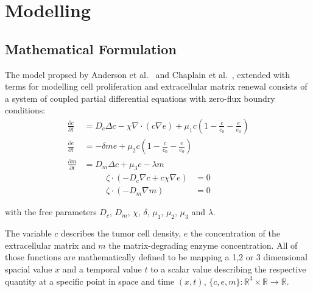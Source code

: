 \section{Modelling}

\subsection{Mathematical Formulation}

The model propsed by Anderson et al.~\cite{anderson_continuous_1998,anderson_mathematical_2000} and Chaplain et al.~\cite{anderson_continuous_1998,chaplain_mathematical_2006-1,franssen_mathematical_2019}, extended with terms for modelling cell proliferation and extracellular matrix renewal consists of a system of coupled partial differential equations with zero-flux boundry conditions: 
\begin{align}
	\frac{\partial c}{\partial t} &= D_c \Delta c - \chi \nabla \cdot (c\nabla e)  + \mu_1 c\left(1-\frac{c}{c_0}-\frac{e}{e_0}\right)\label{eq1}\\
	\frac{\partial e}{\partial t} &= -\delta m e  + \mu_2 c\left(1-\frac{c}{c_0}-\frac{e}{e_0}\right)\label{eq2}\\
	\frac{\partial m}{\partial t} &= D_m \Delta c + \mu_3 c - \lambda m\label{eq3}
\end{align}
\begin{align}
	\zeta \cdot  (-D_c \nabla c + c \chi\nabla e) &= 0 \label{eq4}\\
	\zeta \cdot (-D_m\nabla m ) &= 0\label{eq5}
\end{align}

with the free parameters $D_c$, $D_m$, $\chi$, $\delta$, $\mu_1$, $\mu_2$, $\mu_3$ and $\lambda$. 

The variable $c$ describes the tumor cell density, $e$ the concentration of the extracellular matrix and $m$ the matrix-degrading enzyme concentration. All of those functions are mathematically defined to be mapping a 1,2 or 3 dimensional spacial value $x$ and a temporal value $t$ to a scalar value describing the respective quantity at a specific point in space and time $(x,t)$, $\{c,e,m\} : \mathbb{R}^{3} \times \mathbb{R} \rightarrow \mathbb{R}$.

